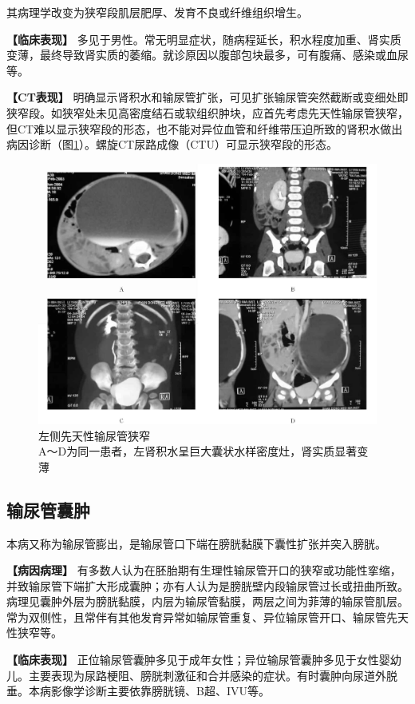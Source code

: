 其病理学改变为狭窄段肌层肥厚、发育不良或纤维组织增生。

\textbf{【临床表现】}
多见于男性。常无明显症状，随病程延长，积水程度加重、肾实质变薄，最终导致肾实质的萎缩。就诊原因以腹部包块最多，可有腹痛、感染或血尿等。

\textbf{【CT表现】}
明确显示肾积水和输尿管扩张，可见扩张输尿管突然截断或变细处即狭窄段。如狭窄处未见高密度结石或软组织肿块，应首先考虑先天性输尿管狭窄，但CT难以显示狭窄段的形态，也不能对异位血管和纤维带压迫所致的肾积水做出病因诊断（图\ref{fig15-6}）。螺旋CT尿路成像（CTU）可显示狭窄段的形态。

\begin{figure}[!htbp]
 \centering
 \includegraphics[width=.7\textwidth,height=\textheight,keepaspectratio]{./images/Image00321.jpg}
 \captionsetup{justification=centering}
 \caption{左侧先天性输尿管狭窄\\{\small A～D为同一患者，左肾积水呈巨大囊状水样密度灶，肾实质显著变薄}}
 \label{fig15-6}
  \end{figure} 

\subsection{输尿管囊肿}

本病又称为输尿管膨出，是输尿管口下端在膀胱黏膜下囊性扩张并突入膀胱。

\textbf{【病因病理】}
有多数人认为在胚胎期有生理性输尿管开口的狭窄或功能性挛缩，并致输尿管下端扩大形成囊肿；亦有人认为是膀胱壁内段输尿管过长或扭曲所致。病理见囊肿外层为膀胱黏膜，内层为输尿管黏膜，两层之间为菲薄的输尿管肌层。常为双侧性，且常伴有其他发育异常如输尿管重复、异位输尿管开口、输尿管先天性狭窄等。

\textbf{【临床表现】}
正位输尿管囊肿多见于成年女性；异位输尿管囊肿多见于女性婴幼儿。主要表现为尿路梗阻、膀胱刺激征和合并感染的症状。有时囊肿向尿道外脱垂。本病影像学诊断主要依靠膀胱镜、B超、IVU等。

